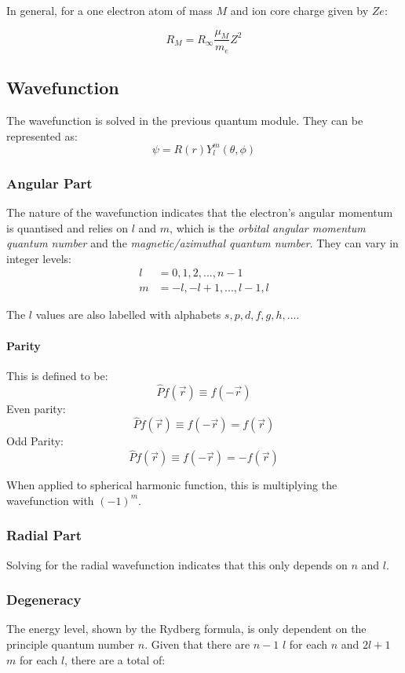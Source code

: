 \documentclass[12pt]{article}
\begin{document}
In general, for a one electron atom of mass $M$ and ion core charge given by $Ze$:

\[R_M = R_\infty\frac{\mu_M}{m_e}Z^2\]

\subsection{Wavefunction}
The wavefunction is solved in the previous quantum module. They can be represented as:
\[ \psi = R(r)Y^m_l(\theta,\phi)\]

\subsubsection{Angular Part}
The nature of the wavefunction indicates that the electron's angular momentum is quantised and relies on $l$ and $m$, which is the \textit{orbital angular momentum quantum number} and the \textit{magnetic/azimuthal quantum number}. They can vary in integer levels:
\begin{align*}
    l &= 0, 1, 2,..., n - 1\\
    m &= -l, -l+1,...,l-1,l
\end{align*}

The $l$ values are also labelled with alphabets $s,p,d,f,g,h,...$.

\paragraph{Parity}
This is defined to be:
\[\hat{P} f(\vec{r}) \equiv f(-\vec{r})\]
Even parity:
\[\hat{P} f(\vec{r}) \equiv f(-\vec{r}) =  f(\vec{r})\]
Odd Parity:
\[\hat{P} f(\vec{r}) \equiv f(-\vec{r}) =  -f(\vec{r})\]

When applied to spherical harmonic function, this is multiplying the wavefunction with $(-1)^m$.

\subsubsection{Radial Part}

Solving for the radial wavefunction indicates that this only depends on $n$ and $l$.

\subsubsection{Degeneracy}

The energy level, shown by the Rydberg formula, is only dependent on the principle quantum number $n$. Given that there are $n-1$ $l$ for each $n$ and $2l+1$ $m$ for each $l$, there are a total of:
\end{document}
